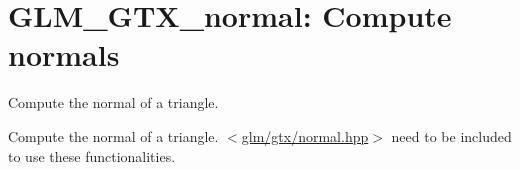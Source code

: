 \hypertarget{group__gtx__normal}{\section{\-G\-L\-M\-\_\-\-G\-T\-X\-\_\-normal\-: \-Compute normals}
\label{group__gtx__normal}
}


\-Compute the normal of a triangle.  


\-Compute the normal of a triangle. $<$\hyperlink{normal_8hpp}{glm/gtx/normal.\-hpp}$>$ need to be included to use these functionalities. 